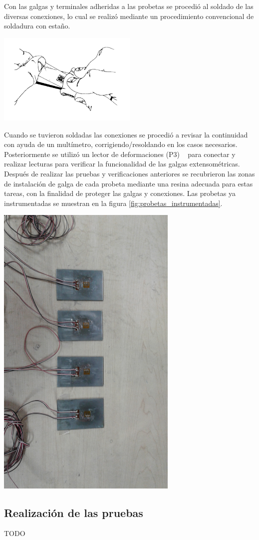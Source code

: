 Con las galgas y terminales adheridas a las probetas se procedió al soldado de las diversas conexiones, lo 
cual se realizó mediante un procedimiento convencional de soldadura con estaño.

\begin{center}
\includegraphics[width=0.5\textwidth]{src/ch3/deslizar_adhesivo.png}
\label{fig:deslizar_adhesivo}
\end{center}

Cuando se tuvieron soldadas las conexiones se procedió a revisar la continuidad con ayuda de un 
multímetro, corrigiendo/resoldando en los casos necesarios. Posteriormente se utilizó un lector 
de deformaciones (P3) ~\cite{p3indicator} para conectar y realizar lecturas para verificar la funcionalidad de las 
galgas extensométricas.\\

Después de realizar las pruebas y verificaciones anteriores se recubrieron las zonas de instalación 
de galga de cada probeta mediante una resina adecuada para estas tareas, con la finalidad de 
proteger las galgas y conexiones. Las probetas ya instrumentadas se muestran en la 
figura \ref{fig:probetas_instrumentadas}.

\begin{center}
\includegraphics[width=0.65\textwidth]{src/ch3/probetas_instrumentadas.jpg}
\label{fig:probetas_instrumentadas}
\end{center}


\subsection{Realización de las pruebas}

TODO




